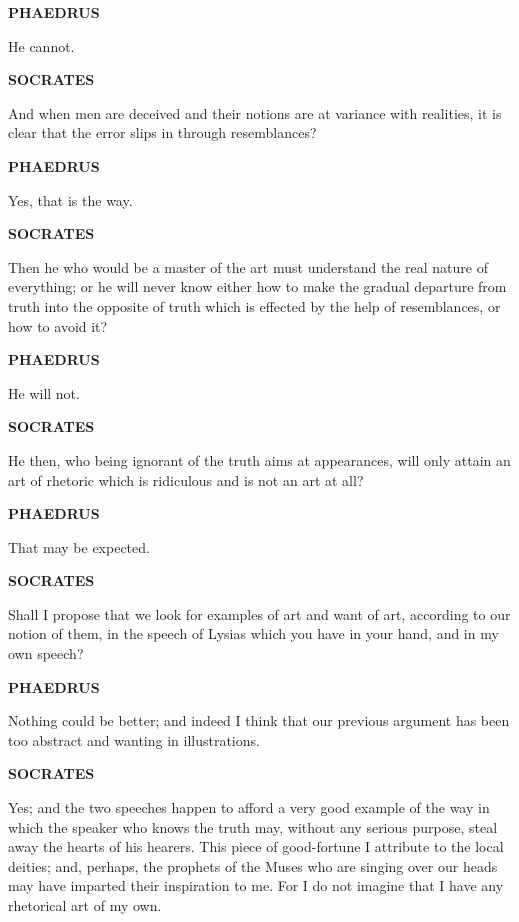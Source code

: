 \documentclass[11pt,letter]{article}
\begin{document}
\par \textbf{PHAEDRUS}
\par   He cannot.

\par \textbf{SOCRATES}
\par   And when men are deceived and their notions are at variance with realities, it is clear that the error slips in through resemblances?

\par \textbf{PHAEDRUS}
\par   Yes, that is the way.

\par \textbf{SOCRATES}
\par   Then he who would be a master of the art must understand the real nature of everything; or he will never know either how to make the gradual departure from truth into the opposite of truth which is effected by the help of resemblances, or how to avoid it?

\par \textbf{PHAEDRUS}
\par   He will not.

\par \textbf{SOCRATES}
\par   He then, who being ignorant of the truth aims at appearances, will only attain an art of rhetoric which is ridiculous and is not an art at all?

\par \textbf{PHAEDRUS}
\par   That may be expected.

\par \textbf{SOCRATES}
\par   Shall I propose that we look for examples of art and want of art, according to our notion of them, in the speech of Lysias which you have in your hand, and in my own speech?

\par \textbf{PHAEDRUS}
\par   Nothing could be better; and indeed I think that our previous argument has been too abstract and wanting in illustrations.

\par \textbf{SOCRATES}
\par   Yes; and the two speeches happen to afford a very good example of the way in which the speaker who knows the truth may, without any serious purpose, steal away the hearts of his hearers. This piece of good-fortune I attribute to the local deities; and, perhaps, the prophets of the Muses who are singing over our heads may have imparted their inspiration to me. For I do not imagine that I have any rhetorical art of my own.
\end{document}
